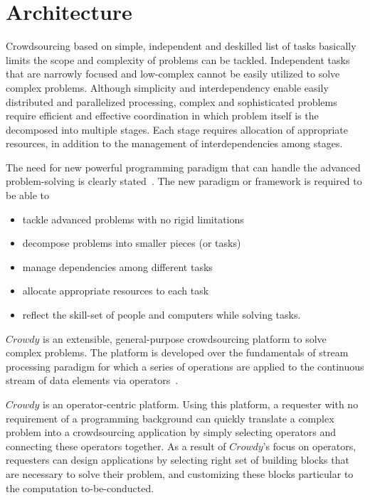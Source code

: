 \chapter{Architecture}
\label{chap:architecture}

Crowdsourcing based on simple, independent and deskilled list of tasks basically 
limits the scope and complexity of problems can be tackled. Independent tasks that 
are narrowly focused and low-complex cannot be easily utilized to solve complex 
problems. Although simplicity and interdependency enable easily distributed and 
parallelized processing, complex and sophisticated problems require efficient and 
effective coordination in which problem itself is the decomposed into multiple stages. 
Each stage requires allocation of appropriate resources, in addition to the management of interdependencies among stages.

The need for new powerful programming paradigm that can handle the advanced 
problem-solving is clearly stated~\cite{Doan2011, Kittur2013, Bernstein2012}. 
The new paradigm or framework is required to be able to 
\begin{itemize}
	\item tackle advanced problems with no rigid limitations
	\item decompose problems into smaller pieces (or tasks)
	\item manage dependencies among different tasks
	\item allocate appropriate resources to each task
	\item reflect the skill-set of people and computers while solving tasks.
\end{itemize}

$Crowdy$ is an extensible, general-purpose crowdsourcing platform to solve 
complex problems. The platform is developed over the fundamentals of stream 
processing paradigm for which a series of operations are applied to the continuous 
stream of data elements via operators~\cite{Gedik2014}.

$Crowdy$ is an operator-centric platform. Using this platform, a requester with no 
requirement of a programming background can quickly translate a complex problem into 
a crowdsourcing application by simply selecting operators and connecting these operators 
together. As a result of $Crowdy$'s focus on operators, requesters can design applications 
by selecting right set of building blocks that are necessary to solve their problem, 
and customizing these blocks particular to the computation to-be-conducted.

